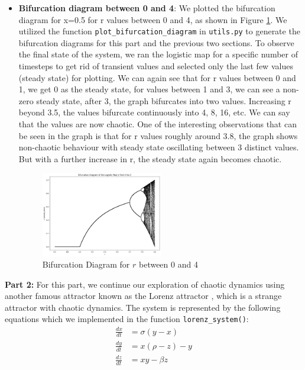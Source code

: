 \begin{itemize}
\item \textbf{Bifurcation diagram between 0 and 4}: We plotted the bifurcation diagram for x=0.5 for r values between 0 and 4, as shown in Figure \ref{fig:bifurcation_0_4}. We utilized the function \texttt{plot\_bifurcation\_diagram} in \texttt{utils.py} to generate the bifurcation diagrams for this part and the previous two sections. To observe the final state of the system, we ran the logistic map for a specific number of timesteps to get rid of transient values and selected only the last few values (steady state) for plotting. We can again see that for r values between 0 and 1, we get 0 as the steady state, for values between 1 and 3, we can see a non-zero steady state, after 3, the graph bifurcates into two values. Increasing r beyond 3.5, the values bifurcate continuously into 4, 8, 16, etc. We can say that the values are now chaotic. One of the interesting observations that can be seen in the graph is that for r values roughly around 3.8, the graph shows non-chaotic behaviour with steady state oscillating between 3 distinct values. But with a further increase in r, the steady state again becomes chaotic.



\begin{figure} [H]
    \centering
    \includegraphics[width=0.5\textwidth]{images/ex4task4_bifurcation_diagam_final.png}
    \caption{Bifurcation Diagram for $r$ between 0 and 4}
    \label{fig:bifurcation_0_4}
\end{figure}

\end{itemize}

\textbf{Part 2:} For this part, we continue our exploration of chaotic dynamics using another famous attractor known as the Lorenz attractor \cite{lorenz1963}, which is a strange attractor with chaotic dynamics. The system is represented by the following equations which we implemented in the function \texttt{lorenz\_system()}:
    \begin{align}
        \frac{dx}{dt} &= \sigma(y - x) \\
        \frac{dy}{dt} &= x(\rho - z) - y \\
        \frac{dz}{dt} &= xy - \beta z
    \end{align}

